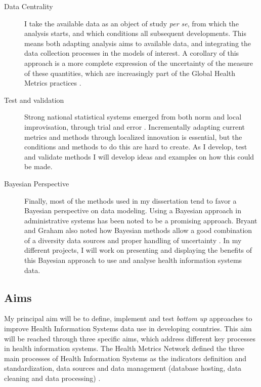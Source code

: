 \begin{description}
\item[Data Centrality] I take the available data as an object of study \textit{per se}, from which the analysis starts, and which conditions all subsequent developments. This means both adapting analysis aims to available data, and integrating the data collection processes in the models of interest. A corollary of this approach is a more complete expression of the uncertainty of the measure of these quantities, which are increasingly part of the Global Health Metrics practices \citep{murray_towards_2007}.
\item[Test and validation] Strong national statistical systems emerged from both norm and local improvisation, through trial and error \citep{lecuyer_medecins_1987,chaperon_information_1988}. Incrementally adapting current metrics and  methods through localized innovation is essential, but the conditions and methods to do this are hard to create. As I develop, test and validate methods I will develop ideas and examples on how this could be made.
\item[Bayesian Perspective] Finally, most of the methods used in my dissertation tend to favor a Bayesian perspective on data modeling. Using a Bayesian approach in administrative systems has been noted to be a promising approach\citep{fienberg_bayesian_2011,little_calibrated_2012}. Bryant and Graham also noted how Bayesian methods allow a good combination of a diversity data sources and proper handling of uncertainty \citep{bryant_bayesian_2013}. In my different projects, I will work on presenting and displaying the benefits of this Bayesian approach to use and analyse health information systems data.
\end{description}


\subsection{Aims}

My principal aim will be to define, implement and test \textit{bottom up} approaches to improve Health Information Systems data use in developing countries. This aim will be reached through three specific aims, which address different key processes in health information systems. The Health Metrics Network defined the three main processes of Health Information Systems as the indicators definition and standardization, data sources and data management (database hosting, data cleaning and data processing) \citep{health_metrics_network_framework_2008}.

